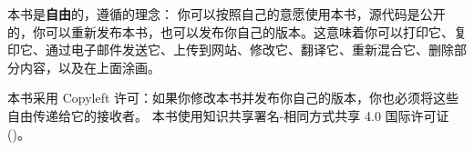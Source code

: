 \lettrine[lraise=-0.03,loversize=0.08]{本}{书}是\textbf{自由}的，遵循的理念：
你可以按照自己的意愿使用本书，源代码是公开的，你可以重新发布本书，也可以发布你自己的版本。这意味着你可以打印它、复印它、通过电子邮件发送它、上传到网站、修改它、翻译它、重新混合它、删除部分内容，以及在上面涂画。

本书采用 Copyleft 许可：如果你修改本书并发布你自己的版本，你也必须将这些自由传递给它的接收者。
本书使用知识共享署名-相同方式共享 4.0 国际许可证
(\href{http://creativecommons.org/licenses/by-sa/4.0/}{})。